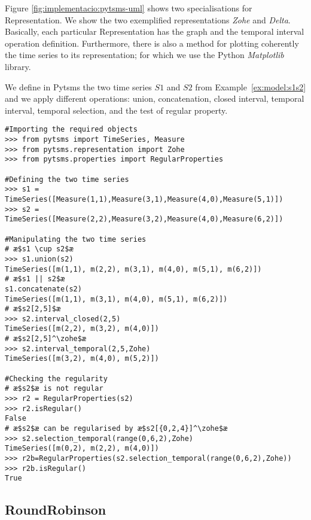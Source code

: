 Figure \ref{fig:implementacio:pytsms-uml} shows two specialisations
for Representation. We show the two exemplified representations
\emph{Zohe} and \emph{Delta}. Basically, each particular
Representation has the graph and the temporal interval operation
definition. Furthermore, there is also a method for plotting
coherently the time series to its representation; for which we use the
Python \emph{Matplotlib} library.



\begin{example}
  We define in Pytsms the two time series $S1$ and $S2$ from
  Example~\ref{ex:model:s1s2} and we apply different operations:
  union, concatenation, closed interval, \zohe{} temporal interval,
  \zohe{} temporal selection, and the test of regular property.
\begin{lstlisting}[style=py]
#Importing the required objects
>>> from pytsms import TimeSeries, Measure
>>> from pytsms.representation import Zohe
>>> from pytsms.properties import RegularProperties

#Defining the two time series
>>> s1 = TimeSeries([Measure(1,1),Measure(3,1),Measure(4,0),Measure(5,1)])
>>> s2 = TimeSeries([Measure(2,2),Measure(3,2),Measure(4,0),Measure(6,2)])

#Manipulating the two time series
# æ$s1 \cup s2$æ
>>> s1.union(s2)
TimeSeries([m(1,1), m(2,2), m(3,1), m(4,0), m(5,1), m(6,2)])
# æ$s1 || s2$æ
s1.concatenate(s2) 
TimeSeries([m(1,1), m(3,1), m(4,0), m(5,1), m(6,2)])
# æ$s2[2,5]$æ
>>> s2.interval_closed(2,5)
TimeSeries([m(2,2), m(3,2), m(4,0)])
# æ$s2[2,5]^\zohe$æ
>>> s2.interval_temporal(2,5,Zohe)
TimeSeries([m(3,2), m(4,0), m(5,2)])

#Checking the regularity
# æ$s2$æ is not regular
>>> r2 = RegularProperties(s2)
>>> r2.isRegular()
False
# æ$s2$æ can be regularised by æ$s2[{0,2,4}]^\zohe$æ
>>> s2.selection_temporal(range(0,6,2),Zohe)
TimeSeries([m(0,2), m(2,2), m(4,0)])
>>> r2b=RegularProperties(s2.selection_temporal(range(0,6,2),Zohe))
>>> r2b.isRegular()
True
\end{lstlisting}
\end{example}





\subsection{RoundRobinson}


